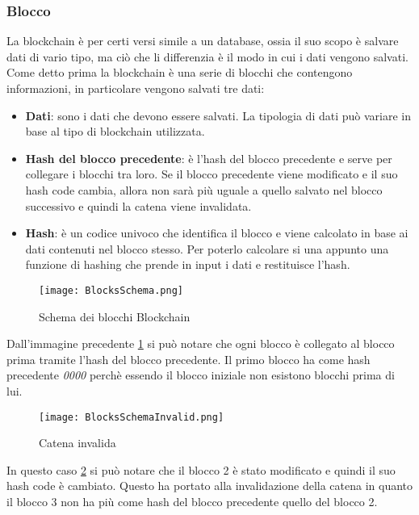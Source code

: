 \subsubsection{Blocco}
La blockchain è per certi versi simile a un database, ossia il suo scopo è
salvare dati di vario tipo, ma ciò che li differenzia è il modo in cui i dati
vengono salvati. \\ 
Come detto prima la blockchain è una serie di blocchi che contengono
informazioni, in particolare vengono salvati tre dati:
\begin{itemize}
    \item \textbf{Dati}: sono i dati che devono essere salvati. La tipologia di 
        dati può variare in base al tipo di blockchain utilizzata.
    \item \textbf{Hash del blocco precedente}: è l'hash del blocco precedente
        e serve per collegare i blocchi tra loro. Se il blocco precedente viene
        modificato e il suo hash code  cambia, allora non sarà più uguale a
        quello salvato nel blocco successivo e quindi la catena viene
        invalidata.
    \item \textbf{Hash}: è un codice univoco che identifica il blocco e viene
        calcolato in base ai dati contenuti nel blocco stesso. Per poterlo
        calcolare si una appunto una funzione di hashing che prende in input
        i dati e restituisce l'hash.
\end{itemize}

\begin{figure}[H]
    \centering
    \texttt{[image: BlocksSchema.png]} 
    \caption{Schema dei blocchi Blockchain}
    \label{fig:chain}
\end{figure}

Dall'immagine precedente \ref{fig:chain} si può notare che ogni blocco
è collegato al blocco prima tramite l'hash del blocco precedente. 
Il primo blocco ha come hash precedente \textit{0000} perchè essendo il blocco
iniziale non esistono blocchi prima di lui.

\begin{figure}[H]
    \centering
    \texttt{[image: BlocksSchemaInvalid.png]} 
    \caption{Catena invalida}
    \label{fig:invalidChain}
\end{figure}

In questo caso \ref{fig:invalidChain} si può notare che il blocco 2 è stato
modificato e quindi il suo hash code è cambiato. Questo ha portato alla
invalidazione della catena in quanto il blocco 3 non ha più come hash del
blocco precedente quello del blocco 2.

